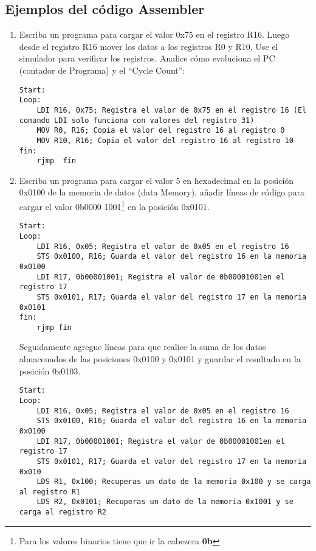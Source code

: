 \documentclass[
	12pt, %
	fleqn, %
	a4paper, %
	oneside, %
]{LegrandOrangeBook}
\begin{document}
\subsection{Ejemplos del código Assembler}
\begin{enumerate}
\item Escriba un programa para cargar el valor 0x75 en el registro R16. Luego desde el registro R16 mover los datos a los registros R0 y R10. Use el simulador para verificar los registros. Analice cómo evoluciona el PC (contador de Programa) y el ``Cycle Count'':
\begin{lstlisting}[language={[RISC-V]Assembler},frame=single,caption={Crear y mover registros},captionpos=b,numbers=none]
Start:
Loop:
	LDI R16, 0x75; Registra el valor de 0x75 en el registro 16 (El comando LDI solo funciona con valores del registro 31)
    MOV R0, R16; Copia el valor del registro 16 al registro 0
    MOV R10, R16; Copia el valor del registro 16 al registro 10
fin:   
    rjmp  fin
\end{lstlisting}
\item Escriba un programa para cargar el valor 5 en hexadecimal en la posición 0x0100 de la memoria de datos (data Memory), añadir líneas de código para cargar el valor 0b0000 1001\footnote{Para los valores binarios tiene que ir la cabezera \textbf{0b}} en la posición 0x0101. 
\begin{lstlisting}[language={[RISC-V]Assembler},frame=single,caption={Acceso a la memoria SRAM},captionpos=b,numbers=none]
Start:
Loop:
	LDI R16, 0x05; Registra el valor de 0x05 en el registro 16
	STS 0x0100, R16; Guarda el valor del registro 16 en la memoria 0x0100
	LDI R17, 0b00001001; Registra el valor de 0b00001001en el registro 17
	STS 0x0101, R17; Guarda el valor del registro 17 en la memoria 0x0101
fin:
	rjmp fin
\end{lstlisting}
Seguidamente agregue líneas para que realice la suma de los datos almacenados de las posiciones 0x0100 y 0x0101 y guardar el resultado en la posición 0x0103.
\begin{lstlisting}[language={[RISC-V]Assembler},frame=single,caption={Movimiento de datos en la SRAM},captionpos=b,numbers=none]
Start:
Loop:
	LDI R16, 0x05; Registra el valor de 0x05 en el registro 16
	STS 0x0100, R16; Guarda el valor del registro 16 en la memoria 0x0100
	LDI R17, 0b00001001; Registra el valor de 0b00001001en el registro 17
	STS 0x0101, R17; Guarda el valor del registro 17 en la memoria 0x010
	LDS R1, 0x100; Recuperas un dato de la memoria 0x100 y se carga al registro R1
	LDS R2, 0x0101; Recuperas un dato de la memoria 0x1001 y se carga al registro R2

\end{lstlisting}
\end{enumerate}
\end{document}
